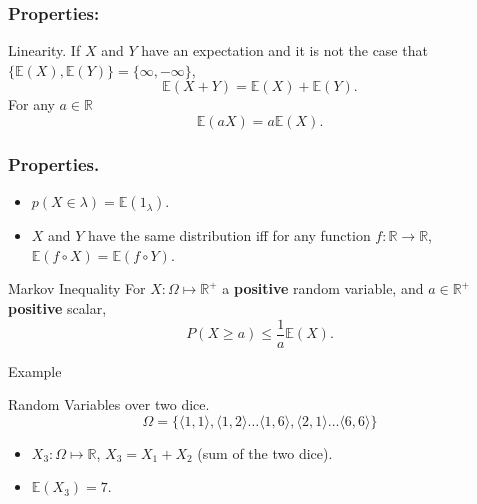 \documentclass{beamer}
\begin{document}
\begin{frame}
  \frametitle{Properties:}
  \begin{block}{Linearity.}
    If $X$ and $Y$ have an expectation and it is not the case that $\{\mathbb{E}(X), \mathbb{E}(Y)\} = \{\infty, {-}\infty\}$,
    \[ \mathbb{E}(X + Y) = \mathbb{E}(X) + \mathbb{E}(Y). \]
    For any $a \in \mathbb{R}$
    \[\mathbb{E}(aX) = a\mathbb{E}(X).\]
  \end{block}
\end{frame}

\begin{frame}
  \frametitle{Properties.}
  \begin{itemize}
  \item $p(X \in \lambda) = \mathbb{E}(1_{\lambda})$.
  \item $X$ and $Y$ have the same distribution iff for any function $f: \mathbb{R} \rightarrow \mathbb{R}$, $\mathbb{E}(f \circ X) = \mathbb{E}(f \circ Y)$.
  \end{itemize}

  \begin{block}{Markov Inequality}
      For $X: \Omega \mapsto \mathbb{R}^{+}$ a {\bf positive} random variable, and $a \in \mathbb{R}^{+}$ {\bf positive} scalar,
      \[P(X \ge a) \le \frac{1}{a}\mathbb{E}(X).\]
  \end{block}
  
\end{frame}

\begin{frame}{Example}
  \begin{exampleblock}{Random Variables over two dice.}
    \[\Omega = \{\langle 1,1 \rangle, \langle 1,2 \rangle \dots \langle 1,6 \rangle, \langle 2,1 \rangle \dots \langle 6,6 \rangle\}\]
    \begin{itemize}
    \item $X_3: \Omega \mapsto \mathbb{R}$, $X_3 = X_1 + X_2$ (sum of the two dice).
    \item $\mathbb{E}(X_3) = 7$.
    \end{itemize}
  \end{exampleblock}
\end{frame}
\end{document}

